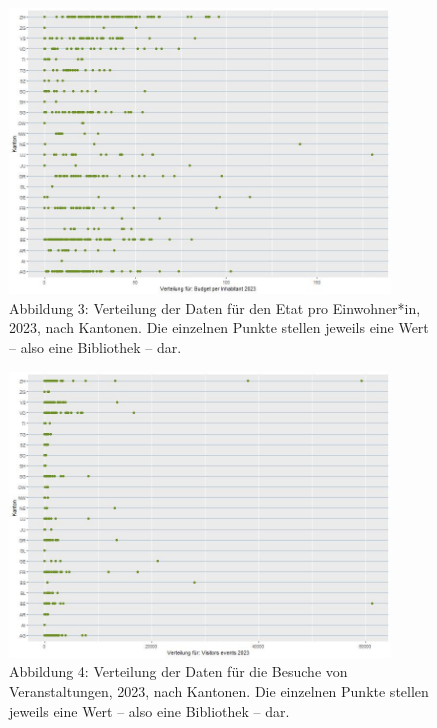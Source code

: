 \documentclass[a4paper,
fontsize=11pt,
oneside,
numbers=noperiodatend,
parskip=half-,
bibliography=totoc,
final
]{scrartcl}
\begin{document}
\begin{figure}
\centering
\includegraphics[angle=90,width=0.9\textwidth]{img/Abbildung03.JPG}
\caption{Abbildung 3: Verteilung der Daten für den Etat pro
Einwohner*in, 2023, nach Kantonen. Die einzelnen Punkte stellen jeweils
eine Wert -- also eine Bibliothek -- dar.}
\end{figure}

\begin{figure}
\centering
\includegraphics[angle=90,width=0.9\textwidth]{img/Abbildung04.JPG}
\caption{Abbildung 4: Verteilung der Daten für die Besuche von
Veranstaltungen, 2023, nach Kantonen. Die einzelnen Punkte stellen
jeweils eine Wert -- also eine Bibliothek -- dar.}
\end{figure}
\end{document}
